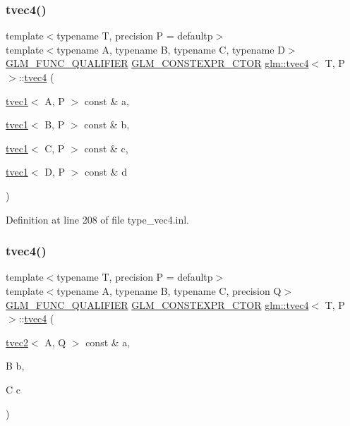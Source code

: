 \subsubsection{\texorpdfstring{tvec4()}{tvec4()}\hspace{0.1cm}{\footnotesize\ttfamily [23/35]}}
{\footnotesize\ttfamily template$<$typename T, precision P = defaultp$>$ \\
template$<$typename A, typename B, typename C, typename D$>$ \\
\mbox{\hyperlink{setup_8hpp_a33fdea6f91c5f834105f7415e2a64407}{G\+L\+M\+\_\+\+F\+U\+N\+C\+\_\+\+Q\+U\+A\+L\+I\+F\+I\+ER}} \mbox{\hyperlink{setup_8hpp_ad34178a09666081abdb573c14d1f4a5a}{G\+L\+M\+\_\+\+C\+O\+N\+S\+T\+E\+X\+P\+R\+\_\+\+C\+T\+OR}} \mbox{\hyperlink{structglm_1_1tvec4}{glm\+::tvec4}}$<$ T, P $>$\+::\mbox{\hyperlink{structglm_1_1tvec4}{tvec4}} (\begin{DoxyParamCaption}\item[{\mbox{\hyperlink{structglm_1_1tvec1}{tvec1}}$<$ A, P $>$ const \&}]{a,  }\item[{\mbox{\hyperlink{structglm_1_1tvec1}{tvec1}}$<$ B, P $>$ const \&}]{b,  }\item[{\mbox{\hyperlink{structglm_1_1tvec1}{tvec1}}$<$ C, P $>$ const \&}]{c,  }\item[{\mbox{\hyperlink{structglm_1_1tvec1}{tvec1}}$<$ D, P $>$ const \&}]{d }\end{DoxyParamCaption})}



Definition at line 208 of file type\+\_\+vec4.\+inl.

\mbox{\label{structglm_1_1tvec4_abc80d97085b0385612ae216bde4c830c}} 
\subsubsection{\texorpdfstring{tvec4()}{tvec4()}\hspace{0.1cm}{\footnotesize\ttfamily [24/35]}}
{\footnotesize\ttfamily template$<$typename T, precision P = defaultp$>$ \\
template$<$typename A, typename B, typename C, precision Q$>$ \\
\mbox{\hyperlink{setup_8hpp_a33fdea6f91c5f834105f7415e2a64407}{G\+L\+M\+\_\+\+F\+U\+N\+C\+\_\+\+Q\+U\+A\+L\+I\+F\+I\+ER}} \mbox{\hyperlink{setup_8hpp_ad34178a09666081abdb573c14d1f4a5a}{G\+L\+M\+\_\+\+C\+O\+N\+S\+T\+E\+X\+P\+R\+\_\+\+C\+T\+OR}} \mbox{\hyperlink{structglm_1_1tvec4}{glm\+::tvec4}}$<$ T, P $>$\+::\mbox{\hyperlink{structglm_1_1tvec4}{tvec4}} (\begin{DoxyParamCaption}\item[{\mbox{\hyperlink{structglm_1_1tvec2}{tvec2}}$<$ A, Q $>$ const \&}]{a,  }\item[{B}]{b,  }\item[{C}]{c }\end{DoxyParamCaption})}



